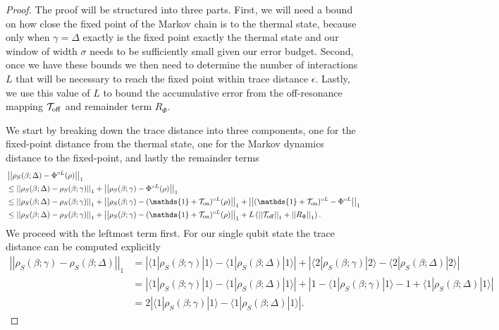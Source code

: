 \documentclass{article}
\newcommand{\on}{\rm on}
\newcommand{\off}{\rm off}
\newcommand{\ket}[1]{|#1\rangle}
\newcommand{\bra}[1]{\langle #1|}
\newcommand{\abs}[1]{\left| #1 \right|}
\newcommand{\norm}[1]{\left| \left| #1 \right| \right|}
\newcommand{\identity}{\mathds{1}}
\begin{document}
\begin{proof}
    The proof will be structured into three parts. First, we will need a bound on how close the fixed point of the Markov chain is to the thermal state, because only when $\gamma = \Delta$ exactly is the fixed point exactly the thermal state and our window of width $\sigma$ needs to be sufficiently small given our error budget. Second, once we have these bounds we then need to determine the number of interactions $L$ that will be necessary to reach the fixed point within trace distance $\epsilon$. Lastly, we use this value of $L$ to bound the accumulative error from the off-resonance mapping $\mathcal{T}_{\off}$ and remainder term $R_{\Phi}$.

    We start by breaking down the trace distance into three components, one for the fixed-point distance from the thermal state, one for the Markov dynamics distance to the fixed-point, and lastly the remainder terms
    \begin{align}
        &\norm{\rho_S(\beta; \Delta) - \Phi^{\circ L}(\rho)}_1 \nonumber \\
        &\le \norm{\rho_S(\beta; \Delta) - \rho_S(\beta; \gamma)}_1 + \norm{\rho_S(\beta; \gamma) - \Phi^{\circ L}(\rho)}_1 \\
        &\le \norm{\rho_S(\beta; \Delta) - \rho_S(\beta; \gamma)}_1 + \norm{\rho_S(\beta; \gamma) - (\identity + \mathcal{T}_{\on})^{\circ L}(\rho)}_1 + \norm{(\identity + \mathcal{T}_{\on})^{\circ L} - \Phi^{\circ L}}_1 \\
        &\le \norm{\rho_S(\beta; \Delta) - \rho_S(\beta; \gamma)}_1 + \norm{\rho_S(\beta; \gamma) - (\identity + \mathcal{T}_{\on})^{\circ L}(\rho)}_1 +  L \left(\norm{\mathcal{T}_{\off}}_1 + \norm{R_{\Phi}}_1 \right). \label{eq:single_qubit_three_errors}
    \end{align}
    We proceed with the leftmost term first. For our single qubit state the trace distance can be computed explicitly
 \begin{align}
     \norm{\rho_S(\beta; \gamma) - \rho_S(\beta; \Delta)}_1 &= \abs{\bra{1} \rho_S(\beta; \gamma) \ket{1} - \bra{1}\rho_S(\beta;\Delta)\ket{1}} + \abs{\bra{2} \rho_S(\beta; \gamma) \ket{2} - \bra{2}\rho_S(\beta; \Delta)\ket{2}} \\
     &= \abs{\bra{1} \rho_S(\beta; \gamma) \ket{1} - \bra{1}\rho_S(\beta; \Delta)\ket{1}} + \abs{1 - \bra{1} \rho_S(\beta; \gamma) \ket{1} -1 + \bra{1}\rho_S(\beta; \Delta)\ket{1}} \\
     &= 2 \abs{\bra{1} \rho_S(\beta; \gamma) \ket{1} - \bra{1}\rho_S(\beta; \Delta)\ket{1}}. \label{eq:single_qubit_int_1}

\end{align}
\end{proof}
\end{document}
